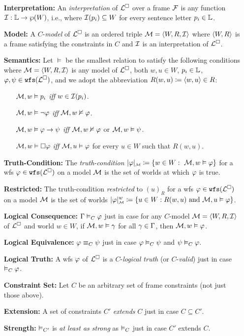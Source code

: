 \documentclass[a4paper, 11pt]{article} %
\begin{document}
\begin{enumerate}[leftmargin=1.2in] %
  \item[\bf Interpretation:] An \textit{interpretation} of $\ML$ over a frame $\F$ is any function $\I : \SL \to \wp(W)$, i.e., where $\I(p_i) \subseteq W$ for every sentence letter $p_i \in \SL$.
	\item[\bf Model:] A $C$-\textit{model} of $\ML$ is an ordered triple $\M = \tuple{W, R, \I}$ where $\tuple{W, R}$ is a frame satisfying the constraints in $C$ and $\I$ is an interpretation of $\ML$.
  \item[\bf Semantics:] Let $\vDash$ be the smallest relation to satisfy the following conditions where $\M = \tuple{W, R, \I}$ is any model of $\ML$, both $w, u \in W$, $p_i \in \SL$, $\metaA, \metaB \in \wfs{\ML}$, and we adopt the abbreviation $R(w,u) \coloneq \tuple{w, u} \in R$:
    \begin{itemize}[leftmargin=.15in]\small
      \item[] $\M, w\vDash  p_i$ \textit{iff} $w \in \I(p_i)$.
      \item[] $\M, w\vDash  \neg \metaA$ \textit{iff} $\M, w\nvDash \metaA$.
      \item[] $\M, w\vDash  \metaA\rightarrow \metaB$ \textit{iff} $\M, w\nvDash \metaA$ or $\M, w\vDash  \metaB$.
      \item[] $\M, w\vDash  \Box \metaA$ \textit{iff} $\M, u\vDash \metaA$ for every $u \in W$ such that $R(w,u)$.
    \end{itemize}
  \item[\bf Truth-Condition:] The \textit{truth-condition} $\interpret{\M}{\metaA} \coloneq \set{w\in W: ~\M, w\vDash  \metaA}$ for a wfs $\metaA \in \wfs{\ML}$ on a model $\M$ is the set of worlds at which $\metaA$ is true.
  \item[\bf Restricted:] The truth-condition \textit{restricted} to $(u)_R$ for a wfs $\metaA \in \wfs{\ML}$ on a model $\M$ is the set of worlds $\interpret{\M}{\metaA}^w \coloneq \set{u\in W : R(w, u) \text{ and } \M, u\vDash  \metaA}$.
  \item[\bf Logical Consequence:] $\MetaG \MLmodels[C] \metaA$ just in case for any $C$-model $\M = \tuple{W, R, \I}$ of $\ML$ and world $w \in W$, if $\M, w \vDash \metaG$ for all $\metaG \in \MetaG$, then $\M, w \vDash \metaA$.
  \item[\bf Logical Equivalence:] $\metaA \MLequiv[C] \metaB$ just in case $\metaA \MLmodels[C] \metaB$ and $\metaB \MLmodels[C] \metaA$.
  \item[\bf Logical Truth:] A wfs $\metaA$ of $\ML$ is a $C$-\textit{logical truth} (or $C$-\textit{valid}) just in case $\MLmodels[C] \metaA$.
  \item[\bf Constraint Set:] Let $C$ be an arbitrary set of frame constraints (not just those above).
  \item[\bf Extension:] A set of constraints $C'$ \textit{extends} $C$ just in case $C \subseteq C'$. 
  \item[\bf Strength:] $\MLmodels[C']$ is \textit{at least as strong} as $\MLmodels[C]$ just in case $C'$ extends $C$. 
\end{enumerate}
\end{document}
